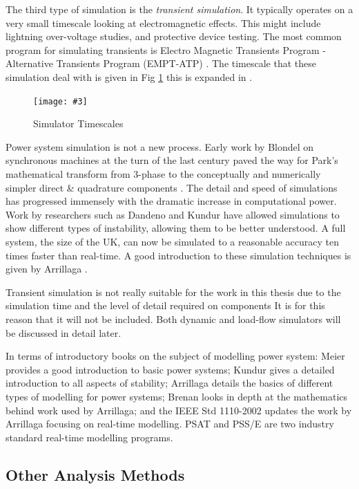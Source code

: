 \documentclass[a4paper,oneside,12pt]{report}
\newcommand{\image}[3] {
  \begin{figure}
    \begin{center}
      \texttt{[image: \#3]}
      \caption{#2}
      \label{#1}
    \end{center}
  \end{figure}
}
\begin{document}
The third type of simulation is the \emph{transient simulation}. It typically operates on a very small timescale looking at electromagnetic effects. This might include lightning over-voltage studies, and protective device testing. The most common program for simulating transients is Electro Magnetic Transients Program - Alternative Transients Program (EMPT-ATP) \cite{Dommel}. The timescale that these simulation deal with is given in Fig \ref{simulatortimescales} this is expanded in \cite{Bennet1999}.

\image{simulatortimescales}{Simulator Timescales}{simulatortimescales.png}

Power system simulation is not a new process. Early work by Blondel on synchronous machines at the turn of the last century \cite{Blondel1913} paved the way for Park's mathematical transform from 3-phase to the conceptually and numerically simpler direct \& quadrature components  \cite{Park1929, Park1933}. The detail and speed of simulations has progressed immensely with the dramatic increase in computational power. Work by researchers such as Dandeno and Kundur \cite{IEEE2003} have allowed simulations to show different types of instability, allowing them to be better understood. A full system, the size of the UK, can now be simulated to a reasonable accuracy ten times faster than real-time. A good introduction to these simulation techniques is given by Arrillaga \cite{Arrillaga2001}.

Transient simulation is not really suitable for the work in this thesis due to the simulation time and the level of detail required on components  It is for this reason that it will not be included. Both dynamic and load-flow simulators will be discussed in detail later.

In terms of introductory books on the subject of modelling power system: Meier \cite{Meier2006} provides a good introduction to basic power systems; Kundur \cite{Kundur1994} gives a detailed introduction to all aspects of stability; Arrillaga \cite{Arrillaga1990, Arrillaga2001} details the basics of different types of modelling for power systems; Brenan \cite{Brenan1987} looks in depth at the mathematics behind work used by Arrillaga; and the IEEE Std 1110-2002 \cite{IEEE2003} updates the work by Arrillaga focusing on real-time modelling. PSAT \cite{Milano} and PSS/E \cite{Siemens} are two industry standard real-time modelling programs.


\subsection{Other Analysis Methods}
\end{document}
